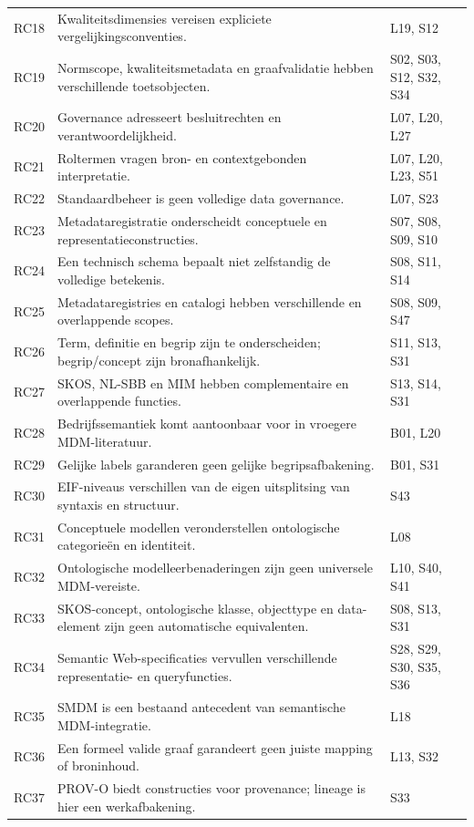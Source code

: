 \begin{longtable}{@{}P{.09\linewidth}P{.59\linewidth}P{.24\linewidth}@{}}
RC18 & Kwaliteitsdimensies vereisen expliciete vergelijkingsconventies. & L19, S12 \\
RC19 & Normscope, kwaliteitsmetadata en graafvalidatie hebben verschillende toetsobjecten. & S02, S03, S12, S32, S34 \\
RC20 & Governance adresseert besluitrechten en verantwoordelijkheid. & L07, L20, L27 \\
RC21 & Roltermen vragen bron- en contextgebonden interpretatie. & L07, L20, L23, S51 \\
RC22 & Standaardbeheer is geen volledige data governance. & L07, S23 \\
RC23 & Metadataregistratie onderscheidt conceptuele en representatieconstructies. & S07, S08, S09, S10 \\
RC24 & Een technisch schema bepaalt niet zelfstandig de volledige betekenis. & S08, S11, S14 \\
RC25 & Metadataregistries en catalogi hebben verschillende en overlappende scopes. & S08, S09, S47 \\
RC26 & Term, definitie en begrip zijn te onderscheiden; begrip/concept zijn bronafhankelijk. & S11, S13, S31 \\
RC27 & SKOS, NL-SBB en MIM hebben complementaire en overlappende functies. & S13, S14, S31 \\
RC28 & Bedrijfssemantiek komt aantoonbaar voor in vroegere MDM-literatuur. & B01, L20 \\
RC29 & Gelijke labels garanderen geen gelijke begripsafbakening. & B01, S31 \\
RC30 & EIF-niveaus verschillen van de eigen uitsplitsing van syntaxis en structuur. & S43 \\
RC31 & Conceptuele modellen veronderstellen ontologische categorieën en identiteit. & L08 \\
RC32 & Ontologische modelleerbenaderingen zijn geen universele MDM-vereiste. & L10, S40, S41 \\
RC33 & SKOS-concept, ontologische klasse, objecttype en data-element zijn geen automatische equivalenten. & S08, S13, S31 \\
RC34 & Semantic Web-specificaties vervullen verschillende representatie- en queryfuncties. & S28, S29, S30, S35, S36 \\
RC35 & SMDM is een bestaand antecedent van semantische MDM-integratie. & L18 \\
RC36 & Een formeel valide graaf garandeert geen juiste mapping of broninhoud. & L13, S32 \\
RC37 & PROV-O biedt constructies voor provenance; lineage is hier een werkafbakening. & S33 \\

\end{longtable}

